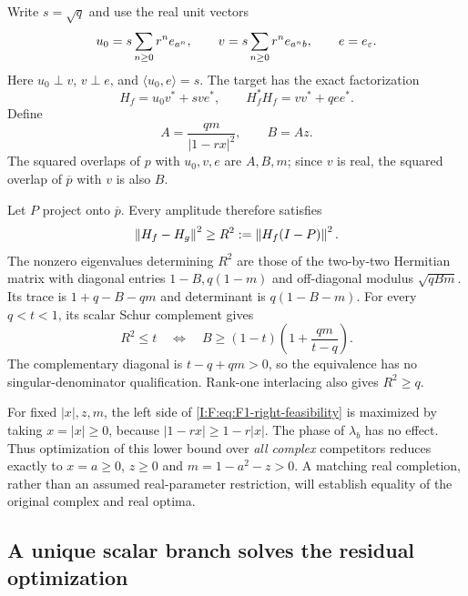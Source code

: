 Write $s=\sqrt q$ and use the real unit vectors
\[
 u_0=s\sum_{n\ge0}r^n e_{a^n},\qquad
 v=s\sum_{n\ge0}r^n e_{a^n b},\qquad e=e_\varepsilon.
\]
Here $u_0\perp v$, $v\perp e$, and $\langle u_0,e\rangle=s$. The
target has the exact factorization
\begin{equation}
 H_f=u_0v^*+sve^*,\qquad H_f^*H_f=vv^*+qee^*.
 \label{I:F:eq:F1-target}
\end{equation}
Define
\begin{equation}
 A=\frac{qm}{|1-rx|^2},\qquad B=Az.
 \label{I:F:eq:F1-overlaps}
\end{equation}
The squared overlaps of $p$ with $u_0,v,e$ are $A,B,m$; since $v$ is
real, the squared overlap of $\overline p$ with $v$ is also $B$.

Let $P$ project onto $\overline p$. Every amplitude therefore satisfies
\begin{equation}
 \left\lVert H_f-H_g\right\rVert^2\ge R^2:=\left\lVert H_f(I-P)\right\rVert^2.
 \label{I:F:eq:F1-input-lower}
\end{equation}
The nonzero eigenvalues determining $R^2$ are those of the two-by-two
Hermitian matrix with diagonal entries $1-B,q(1-m)$ and off-diagonal
modulus $\sqrt{qBm}$. Its trace is $1+q-B-qm$ and determinant is
$q(1-B-m)$. For every $q<t<1$, its scalar Schur complement gives
\begin{equation}
 R^2\le t
 \quad\Longleftrightarrow\quad
 B\ge(1-t)\left(1+\frac{qm}{t-q}\right).
 \label{I:F:eq:F1-right-feasibility}
\end{equation}
The complementary diagonal is $t-q+qm>0$, so the equivalence has no
singular-denominator qualification. Rank-one interlacing also gives
$R^2\ge q$.

For fixed $|x|,z,m$, the left side of
\eqref{I:F:eq:F1-right-feasibility} is maximized by taking $x=|x|\ge0$,
because $|1-rx|\ge1-r|x|$. The phase of $\lambda_b$ has no effect.
Thus optimization of this lower bound over \emph{all complex}
competitors reduces exactly to $x=a\ge0$, $z\ge0$ and
$m=1-a^2-z>0$. A matching real completion, rather than an assumed
real-parameter restriction, will establish equality of the original
complex and real optima.

\subsection{A unique scalar branch solves the residual optimization}

